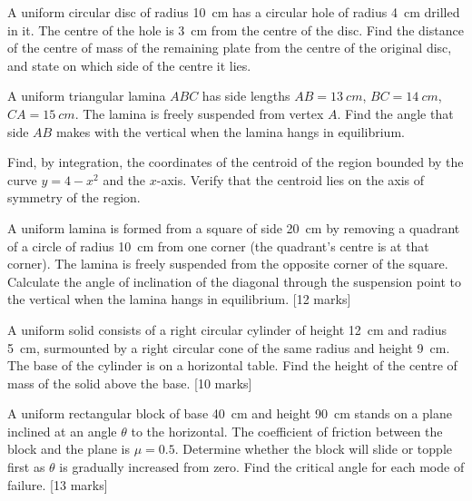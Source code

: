 \documentclass[11pt]{article}
\newcounter{popsec}
\newcounter{popsub}
\newcommand{\courssub}[1]{%
  \stepcounter{popsub}%
  \par\vspace{9pt}\noindent{\popxbold\fontsize{11.5}{13}\selectfont\color{popink}{\color{poporange}\thepopsec.\thepopsub}\hspace{6pt}#1}\par\nopagebreak\vspace{4pt}
}
\begin{document}
\begin{exercice}
A uniform circular disc of radius \SI{10}{cm} has a circular hole of radius \SI{4}{cm} drilled in it. The centre of the hole is \SI{3}{cm} from the centre of the disc. Find the distance of the centre of mass of the remaining plate from the centre of the original disc, and state on which side of the centre it lies.
\end{exercice}

\begin{exercice}
A uniform triangular lamina $ABC$ has side lengths $AB = \SI{13}{cm}$, $BC = \SI{14}{cm}$, $CA = \SI{15}{cm}$. The lamina is freely suspended from vertex $A$. Find the angle that side $AB$ makes with the vertical when the lamina hangs in equilibrium.
\end{exercice}

\begin{exercice}
Find, by integration, the coordinates of the centroid of the region bounded by the curve $y = 4 - x^2$ and the $x$-axis. Verify that the centroid lies on the axis of symmetry of the region.
\end{exercice}

\courssub{I prepare for the GCE}

\begin{exercice}
A uniform lamina is formed from a square of side \SI{20}{cm} by removing a quadrant of a circle of radius \SI{10}{cm} from one corner (the quadrant's centre is at that corner). The lamina is freely suspended from the opposite corner of the square. Calculate the angle of inclination of the diagonal through the suspension point to the vertical when the lamina hangs in equilibrium. \hfill [12 marks]
\end{exercice}

\begin{exercice}
A uniform solid consists of a right circular cylinder of height \SI{12}{cm} and radius \SI{5}{cm}, surmounted by a right circular cone of the same radius and height \SI{9}{cm}. The base of the cylinder is on a horizontal table. Find the height of the centre of mass of the solid above the base. \hfill [10 marks]
\end{exercice}

\begin{exercice}
A uniform rectangular block of base \SI{40}{cm} and height \SI{90}{cm} stands on a plane inclined at an angle $\theta$ to the horizontal. The coefficient of friction between the block and the plane is $\mu = 0.5$. Determine whether the block will slide or topple first as $\theta$ is gradually increased from zero. Find the critical angle for each mode of failure. \hfill [13 marks]
\end{exercice}
\end{document}
